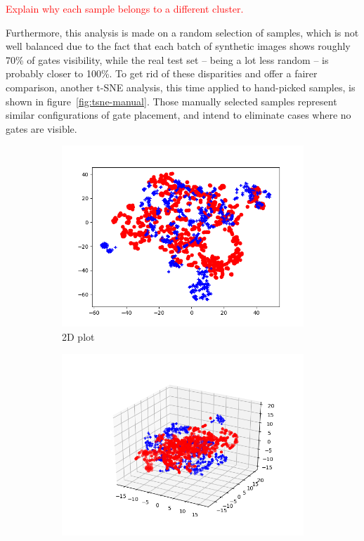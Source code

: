 \textcolor{red}{Explain why each sample belongs to a different cluster.}


Furthermore, this analysis is made on a random selection of samples, which is
not well balanced due to the fact that each batch of synthetic images shows
roughly 70\% of gates visibility, while the real test set -- being a lot less
random -- is probably closer to 100\%. To get rid of these disparities and
offer a fairer comparison, another t-SNE analysis, this time applied to
hand-picked samples, is shown in figure~\ref{fig:tsne-manual}. Those manually
selected samples represent similar configurations of gate placement, and intend
to eliminate cases where no gates are visible.

\begin{figure}[h!]
	\centering
	\begin{subfigure}[h]{0.49\textwidth}
		\includegraphics[width=\textwidth]{figure/tsne-2D.png}
		\caption{2D plot}
	\end{subfigure}
	\begin{subfigure}[h]{0.49\textwidth}
		\includegraphics[width=\textwidth]{figure/tsne-3D.png}

\end{subfigure}
\end{figure}
